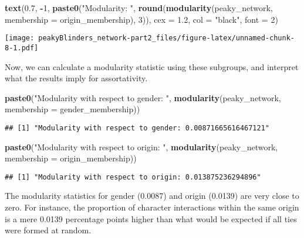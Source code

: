 \documentclass[
]{article}
\newenvironment{Shaded}{\begin{snugshade}}{\end{snugshade}}
\newcommand{\AttributeTok}[1]{\textcolor[rgb]{0.13,0.29,0.53}{#1}}
\newcommand{\DecValTok}[1]{\textcolor[rgb]{0.00,0.00,0.81}{#1}}
\newcommand{\FloatTok}[1]{\textcolor[rgb]{0.00,0.00,0.81}{#1}}
\newcommand{\FunctionTok}[1]{\textcolor[rgb]{0.13,0.29,0.53}{\textbf{#1}}}
\newcommand{\NormalTok}[1]{#1}
\newcommand{\SpecialCharTok}[1]{\textcolor[rgb]{0.81,0.36,0.00}{\textbf{#1}}}
\newcommand{\StringTok}[1]{\textcolor[rgb]{0.31,0.60,0.02}{#1}}
\begin{document}
\begin{Shaded}
\begin{Highlighting}[]
\FunctionTok{text}\NormalTok{(}\FloatTok{0.7}\NormalTok{, }\SpecialCharTok{{-}}\DecValTok{1}\NormalTok{, }
     \FunctionTok{paste0}\NormalTok{(}\StringTok{"Modularity: "}\NormalTok{, }\FunctionTok{round}\NormalTok{(}\FunctionTok{modularity}\NormalTok{(peaky\_network,  }\AttributeTok{membership =}\NormalTok{ origin\_membership), }\DecValTok{3}\NormalTok{)), }
     \AttributeTok{cex =} \FloatTok{1.2}\NormalTok{, }
     \AttributeTok{col =} \StringTok{"black"}\NormalTok{,}
     \AttributeTok{font =} \DecValTok{2}\NormalTok{)}
\end{Highlighting}
\end{Shaded}

\texttt{[image: peakyBlinders\_network-part2\_files/figure-latex/unnamed-chunk-8-1.pdf]}

Now, we can calculate a modularity statistic using these subgroups, and
interpret what the results imply for assortativity.

\begin{Shaded}
\begin{Highlighting}[]
\FunctionTok{paste0}\NormalTok{(}\StringTok{"Modularity with respect to gender: "}\NormalTok{, }\FunctionTok{modularity}\NormalTok{(peaky\_network,  }\AttributeTok{membership =}\NormalTok{ gender\_membership))}
\end{Highlighting}
\end{Shaded}

\begin{verbatim}
## [1] "Modularity with respect to gender: 0.00871665616467121"
\end{verbatim}

\begin{Shaded}
\begin{Highlighting}[]
\FunctionTok{paste0}\NormalTok{(}\StringTok{"Modularity with respect to origin: "}\NormalTok{, }\FunctionTok{modularity}\NormalTok{(peaky\_network,  }\AttributeTok{membership =}\NormalTok{ origin\_membership))}
\end{Highlighting}
\end{Shaded}

\begin{verbatim}
## [1] "Modularity with respect to origin: 0.013875236294896"
\end{verbatim}

The modularity statistics for gender (0.0087) and origin (0.0139) are
very close to zero. For instance, the proportion of character
interactions within the same origin is a mere 0.0139 percentage points
higher than what would be expected if all ties were formed at random.
\end{document}
